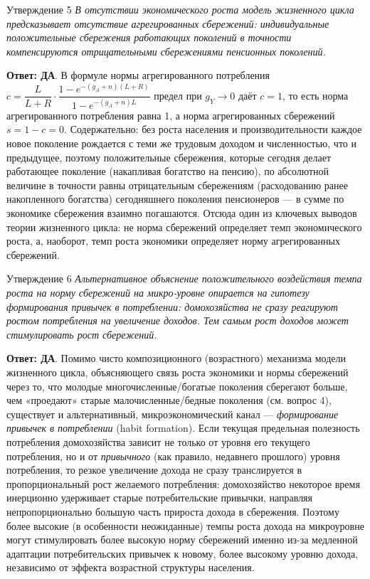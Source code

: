 \documentclass[10pt,a4paper]{article}
\newcommand{\qda}{\textbf{\color{yesgreen}Ответ: ДА}}
\newenvironment{answer}[2]{%
  \begin{qbox}{Утверждение #1}
  \textit{#2}\par\smallskip
}{%
  \end{qbox}\vspace{2pt}
}
\begin{document}
\begin{answer}{5}{В отсутствии экономического роста модель жизненного цикла предсказывает отсутствие агрегированных сбережений: индивидуальные положительные сбережения работающих поколений в точности компенсируются отрицательными сбережениями пенсионных поколений.}
\qda. В формуле нормы агрегированного потребления $c=\dfrac{L}{L+R}\cdot\dfrac{1-e^{-(g_A+n)(L+R)}}{1-e^{-(g_A+n)L}}$ предел при $g_Y\to 0$ даёт $c=1$, то есть норма агрегированного потребления равна 1, а норма агрегированных сбережений $s=1-c=0$. Содержательно: без роста населения и производительности каждое новое поколение рождается с теми же трудовым доходом и численностью, что и предыдущее, поэтому положительные сбережения, которые сегодня делает работающее поколение (накапливая богатство на пенсию), по абсолютной величине в точности равны отрицательным сбережениям (расходованию ранее накопленного богатства) сегодняшнего поколения пенсионеров — в сумме по экономике сбережения взаимно погашаются. Отсюда один из ключевых выводов теории жизненного цикла: не норма сбережений определяет темп экономического роста, а, наоборот, темп роста экономики определяет норму агрегированных сбережений.
\end{answer}
 
\begin{answer}{6}{Альтернативное объяснение положительного воздействия темпа роста на норму сбережений на микро-уровне опирается на гипотезу формирования привычек в потреблении: домохозяйства не сразу реагируют ростом потребления на увеличение доходов. Тем самым рост доходов может стимулировать рост сбережений.}
\qda. Помимо чисто композиционного (возрастного) механизма модели жизненного цикла, объясняющего связь роста экономики и нормы сбережений через то, что молодые многочисленные/богатые поколения сберегают больше, чем «проедают» старые малочисленные/бедные поколения (см. вопрос 4), существует и альтернативный, микроэкономический канал — \emph{формирование привычек в потреблении} (habit formation). Если текущая предельная полезность потребления домохозяйства зависит не только от уровня его текущего потребления, но и от \emph{привычного} (как правило, недавнего прошлого) уровня потребления, то резкое увеличение дохода не сразу транслируется в пропорциональный рост желаемого потребления: домохозяйство некоторое время инерционно удерживает старые потребительские привычки, направляя непропорционально большую часть прироста дохода в сбережения. Поэтому более высокие (в особенности неожиданные) темпы роста дохода на микроуровне могут стимулировать более высокую норму сбережений именно из-за медленной адаптации потребительских привычек к новому, более высокому уровню дохода, независимо от эффекта возрастной структуры населения.
\end{answer}
 
\end{document}
